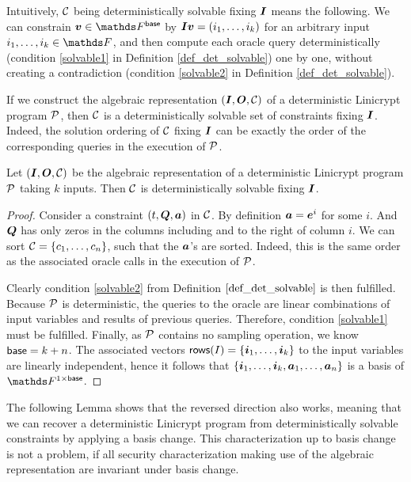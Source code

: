 Intuitively, $\C$ being deterministically solvable fixing $\I$ means the following.
We can constrain $\vv \in \Fsp$ by $\Inp \vv = (i_1, \dots, i_k)$ for an arbitrary input $i_1, \dots, i_k \in \F$,
and then compute each oracle query deterministically (condition \ref{solvable1} in Definition \ref{def_det_solvable}) one by one,
without creating a contradiction (condition \ref{solvable2} in Definition \ref{def_det_solvable}).

If we construct the algebraic representation $(\I, \O, \C)$ of a deterministic Linicrypt program $\P$,
then $\C$ is a deterministically solvable set of constraints fixing $\I$.
Indeed, the solution ordering of $\C$ fixing $\I$
can be exactly the order of the corresponding queries in the execution of $\P$.

\begin{lemma}
\label{alg_rep_det_solvable}
    Let $(\I, \O, \C)$ be the algebraic representation of a deterministic Linicrypt program $\P$ taking $k$ inputs.
    Then $\C$ is deterministically solvable fixing $\I$.
\end{lemma}

\begin{proof}
    Consider a constraint $(t, \Q, \va)$ in $\C$.
    By definition $\va = \ve^i$ for some $i$.
    And $\Q$ has only zeros in the columns including and to the right of column $i$.
    We can sort $\C = \{\dts c n\}$, such that the $\va$'s are sorted.
    Indeed, this is the same order as the associated oracle calls in the execution of $\P$.
    
    Clearly condition \ref{solvable2} from Definition $\ref{def_det_solvable}$ is then fulfilled.
    Because $\P$ is deterministic, 
    the queries to the oracle are linear combinations of input variables and results of previous queries.
    Therefore, condition \ref{solvable1} must be fulfilled.
    Finally, as $\P$ contains no sampling operation, we know $\base = k + n$.
    The associated vectors $\rows(I) = \{ \dts \vi k \}$ to the input variables are linearly independent,
    hence it follows that $\{ \dts \vi k, \dts \va n \}$ is a basis of $\F^{1\times\base}$. 
\end{proof}

The following Lemma shows that the reversed direction also works,
meaning that we can recover a deterministic Linicrypt program from deterministically solvable constraints by applying a basis change.
This characterization up to basis change is not a problem, 
if all security characterization making use of the algebraic representation are invariant under basis change.

